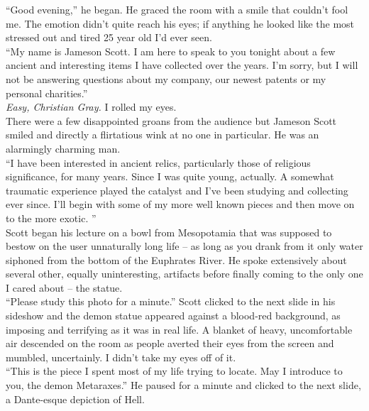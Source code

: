 \documentclass[a5paper]{scrartcl}
\begin{document}
\enquote{Good evening,} he began. He graced the room with a smile that couldn't fool me. The emotion didn't quite reach his eyes; if anything he looked like the most stressed out and tired 25 year old I'd ever seen.\\


\enquote{My name is Jameson Scott. I am here to speak to you tonight about a few ancient and interesting items I have collected over the years. I'm sorry, but I will not be answering questions about my company, our newest patents or my personal charities.}\\


\textit{Easy, Christian Gray.}
 I rolled my eyes.\\


There were a few disappointed groans from the audience but Jameson Scott smiled and directly a flirtatious wink at no one in particular. He was an alarmingly charming man.\\


\enquote{I have been interested in ancient relics, particularly those of religious significance, for many years. Since I was quite young, actually. A somewhat traumatic experience played the catalyst and I've been studying and collecting ever since. I'll begin with some of my more well known pieces and then move on to the more exotic. }\\


Scott began his lecture on a bowl from Mesopotamia that was supposed to bestow on the user unnaturally long life -- as long as you drank from it only water siphoned from the bottom of the Euphrates River. He spoke extensively about several other, equally uninteresting, artifacts before finally coming to the only one I cared about -- the statue.\\


\enquote{Please study this photo for a minute.} Scott clicked to the next slide in his sideshow and the demon statue appeared against a blood-red background, as imposing and terrifying as it was in real life. A blanket of heavy, uncomfortable air descended on the room as people averted their eyes from the screen and mumbled, uncertainly. I didn't take my eyes off of it.\\


\enquote{This is the piece I spent most of my life trying to locate. May I introduce to you, the demon Metaraxes.} He paused for a minute and clicked to the next slide, a Dante-esque depiction of Hell. \\
\end{document}

